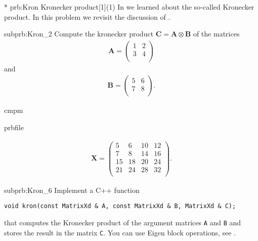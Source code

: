 \renewcommand{\ProblemName}{Kronecker}

\begin{samproblem}*
  {prb:Kron}
  {Kronecker product}[1](1)
  {
    In  we learned about the so-called Kronecker product.
    In this problem we revisit the
    discussion of .
  }

\begin{subproblem}{subprb:Kron_2}
  Compute the kronecker product
  $\mathbf{C} = \mathbf{A} \otimes \mathbf{B}$ of the matrices
\begin{align*}
  \mathbf{A} = \begin{pmatrix}
         1 & 2   \\
         3 & 4   \\
       \end{pmatrix}
\end{align*}
and
\begin{align*}
\mathbf{B}=\begin{pmatrix}
         5 & 6   \\
         7 & 8   \\
       \end{pmatrix}.
\end{align*}

\begin{samwriteprbpart}{cmpm}
  \begin{writeverbatim}{prbfile}
    \begin{samsolution}
      \begin{align*}
\mathbf{X}=\begin{pmatrix}
         5 & 6 & 10 & 12  \\
         7 & 8 & 14 & 16  \\
         15 & 18 & 20 & 24  \\
         21 & 24 & 28 & 32  \\
       \end{pmatrix}.
        \end{align*}
      \end{samsolution}
    \end{writeverbatim}
  \end{samwriteprbpart}
\end{subproblem}

\begin{subproblem}{subprb:Kron_6}
Implement a C++ function
\begin{lstlisting}[style=cppsimple]
void kron(const MatrixXd & A, const MatrixXd & B, MatrixXd & C);
\end{lstlisting}
that computes the Kronecker product of the argument matrices
\texttt{A} and \texttt{B} and stores the result in the matrix \texttt{C}.
You can use Eigen block operations, see  .


\end{subproblem}
\end{samproblem}
